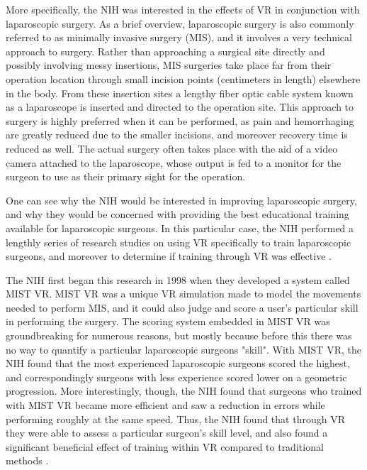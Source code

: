 More specifically, the NIH was interested in the effects of VR in conjunction with laparoscopic surgery. As a brief overview, laparoscopic surgery is also commonly referred to as minimally invasive surgery (MIS), and it involves a very technical approach to surgery. Rather than approaching a surgical site directly and possibly involving messy insertions, MIS surgeries take place far from their operation location through small incision points (centimeters in length) elsewhere in the body. From these insertion sites a lengthy fiber optic cable system known as a laparoscope is inserted and directed to the operation site. This approach to surgery is highly preferred when it can be performed, as pain and hemorrhaging are greatly reduced due to the smaller incisions, and moreover recovery time is reduced as well. The actual surgery often takes place with the aid of a video camera attached to the laparoscope, whose output is fed to a monitor for the surgeon to use as their primary sight for the operation.

One can see why the NIH would be interested in improving laparoscopic surgery, and why they would be concerned with providing the best educational training available for laparoscopic surgeons. In this particular case, the NIH performed a lengthly series of research studies on using VR specifically to train laparoscopic surgeons, and moreover to determine if training through VR was effective \cite{westwood_medicine_1998}.

The NIH first began this research in 1998 when they developed a system called MIST VR. MIST VR was a unique VR simulation made to model the movements needed to perform MIS, and it could also judge and score a user's particular skill in performing the surgery. The scoring system embedded in MIST VR was groundbreaking for numerous reasons, but mostly because before this there was no way to quantify a particular laparoscopic surgeons "skill". With MIST VR, the NIH found that the most experienced laparoscopic surgeons scored the highest, and correspondingly surgeons with less experience scored lower on a geometric progression. More interestingly, though, the NIH found that surgeons who trained with MIST VR became more efficient and saw a reduction in errors while performing roughly at the same speed. Thus, the NIH found that through VR they were able to assess a particular surgeon's skill level, and also found a significant beneficial effect of training within VR compared to traditional methods \cite{gallagher_virtual_2005}.

